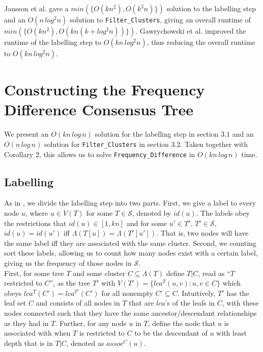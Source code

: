 \documentclass{article}
\newcommand{\leafset}{\Lambda}
\begin{document}
    Jansson et al. \cite{jansson2018algorithms} gave a $min(\{O(kn^2), O(k^2n)\})$ solution to the labelling step and an $O(n\,log^2n)$ solution to \texttt{Filter\_Clusters}, giving an overall runtime of $min(\{O(kn^2), O(kn(k + log^2n))\})$. Gawrychowski et al. \cite{gawrychowski2017faster} improved the runtime of the labelling step to $O(kn\,log^2n)$, thus reducing the overall runtime to $O(kn\,log^2n)$.

    \section{Constructing the Frequency Difference Consensus Tree}
    \label{sec:freqdiffconstruction}

    We present an $O(kn\,log\,n)$ solution for the labelling step in section 3.1 and an $O(n\,log\,n)$ solution for \texttt{Filter\_Clusters} in section 3.2. Taken together with Corollary 2, this allows us to solve \texttt{Frequency\_Difference} in $O(kn\,log\,n)$ time.

    \subsection{Labelling}
    As in \cite{gawrychowski2017faster}, we divide the labelling step into two parts. First, we give a label to every node $u$, where $u \in V(T)$ for some $T \in \mathcal{S}$, denoted by $id(u)$. The labels obey the restrictions that $id(u) \in [1, kn]$ and for some $u' \in T'$, $T' \in \mathcal{S}$, $id(u) = id(u')$ iff $\leafset(T[u]) = \leafset(T'[u'])$. That is, two nodes will have the same label iff they are associated with the same cluster. Second, we counting sort these labels, allowing us to count how many nodes exist with a certain label, giving us the frequency of those nodes in $\mathcal{S}$.\\

    First, for some tree $T$ and some cluster $C \subseteq \leafset(T)$ define $T|C$, read as ``$T$ restricted to $C$'', as the tree $T'$ with $V(T') = \{lca^T(u, v) : u, v \in C\}$ which obeys $lca^T(C') = lca^{T'}(C')$ for all nonempty $C' \subseteq C$. Intuitively, $T'$ has the leaf set $C$ and consists of all nodes in $T$ that are $lca$'s of the leafs in $C$, with these nodes connected such that they have the same ancestor/descendant relationships as they had in $T$. Further, for any node $u$ in $T$, define the node that $u$ is associated with when $T$ is restricted to $C$ to be the descendant of $u$ with least depth that is in $T|C$, denoted as $assoc^{C}(u)$.\\
\end{document}
